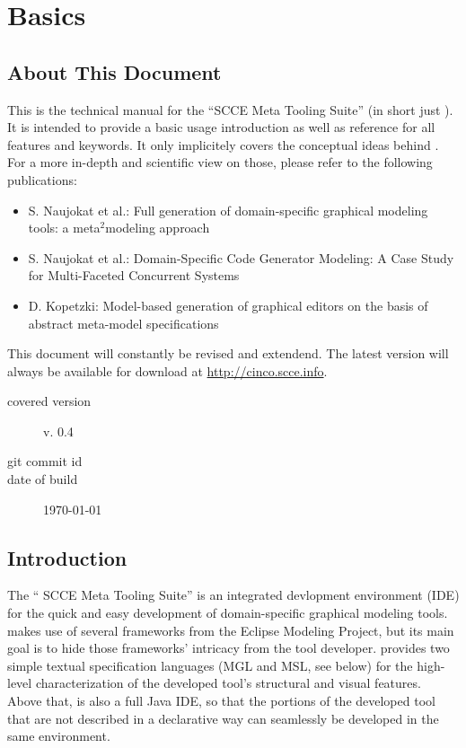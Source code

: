 \documentclass[a4paper,american,12pt]{scrreprt}
\begin{document}
\chapter{Basics}

\section{About This Document}

This is the technical manual for the ``\cinco SCCE Meta Tooling Suite'' (in
short just \cinco). It is intended to provide a basic usage introduction as
well as reference for all features and keywords. It only implicitely covers the
conceptual ideas behind \cinco. For a more in-depth and scientific view on those,
please refer to the following publications:
%
\begin{itemize}
\item S. Naujokat et al.: Full generation of domain-specific graphical modeling tools: a
meta$^2$modeling approach \cite{NaLSKM2014}
\item S. Naujokat et al.: Domain-Specific Code Generator Modeling: A Case Study for
Multi-Faceted Concurrent Systems \cite{NaTISL2014}
\item D. Kopetzki: Model-based generation of graphical editors on
the basis of abstract meta-model specifications \cite{Kopetz2014}
\end{itemize}

This document will constantly be revised and extendend. The latest version will
always be available for download at \url{http://cinco.scce.info}. 

\begin{description}
\item[covered version] \cinco v. 0.4
\item[git commit id] \gitAbbrevHash
\item[date of build] \today
\end{description}

\section{Introduction}

The ``\cinco{} SCCE Meta Tooling Suite'' is an integrated devlopment environment
(IDE) for the quick and easy development of domain-specific graphical modeling
tools. \cinco{} makes use of several frameworks from the Eclipse Modeling
Project, but its main goal is to hide those frameworks' intricacy from the
tool developer. \cinco{} provides two simple textual specification languages (MGL and
MSL, see below) for the high-level characterization of the developed tool's
structural and visual features. Above that, \cinco{} is also a full Java IDE, so
that the portions of the developed tool that are not described in a declarative
way can seamlessly be developed in the same environment.
\end{document}
